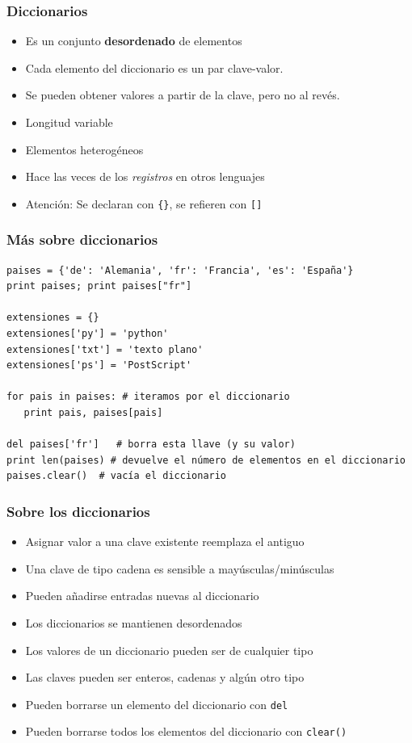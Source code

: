 \documentclass{beamer}
\begin{document}
\begin{frame}[fragile]
\frametitle{Diccionarios}  

\begin{itemize}
\item Es un conjunto {\bf desordenado} de elementos 
\item Cada elemento del diccionario es un par clave-valor. 
\item Se pueden obtener valores a partir de la clave, pero no al revés.
\item Longitud variable
\item Elementos heterogéneos
\item Hace las veces de los \emph{registros} en otros lenguajes
\item Atención: Se declaran con \verb|{}|, se refieren con \verb|[]|
\end{itemize}
\end{frame}


\begin{frame}[fragile]
\frametitle{Más sobre diccionarios}
  \begin{footnotesize}
\begin{verbatim}
paises = {'de': 'Alemania', 'fr': 'Francia', 'es': 'España'}
print paises; print paises["fr"]

extensiones = {}
extensiones['py'] = 'python'
extensiones['txt'] = 'texto plano'
extensiones['ps'] = 'PostScript'

for pais in paises: # iteramos por el diccionario
   print pais, paises[pais]

del paises['fr']   # borra esta llave (y su valor)
print len(paises) # devuelve el número de elementos en el diccionario
paises.clear()  # vacía el diccionario

\end{verbatim}
  \end{footnotesize}

\end{frame}


\begin{frame}[fragile]
\frametitle{Sobre los diccionarios}  

  \begin{itemize}
  \item Asignar valor a una clave existente reemplaza el antiguo 
  \item Una clave de tipo cadena es sensible a mayúsculas/minúsculas
  \item Pueden añadirse entradas nuevas al diccionario
  \item Los diccionarios se mantienen desordenados
\item Los valores de un diccionario pueden ser de cualquier tipo
\item Las claves pueden ser enteros, cadenas y algún otro tipo
\item Pueden borrarse un elemento del diccionario con \verb|del|
\item Pueden borrarse todos los elementos del diccionario con \verb|clear()|
\end{itemize}

\end{frame}
\end{document}
